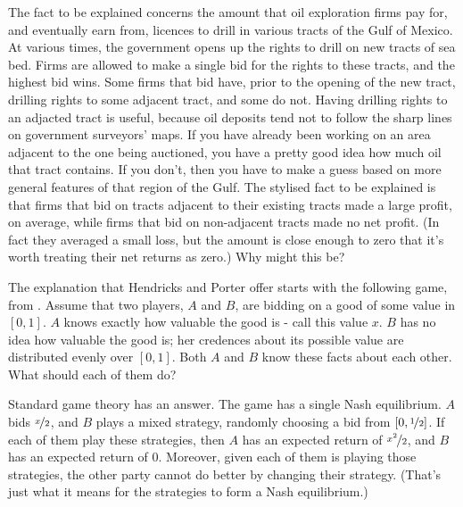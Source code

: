 The fact to be explained concerns the amount that oil exploration firms pay for, and eventually earn from, licences to drill in various tracts of the Gulf of Mexico. At various times, the government opens up the rights to drill on new tracts of sea bed. Firms are allowed to make a single bid for the rights to these tracts, and the highest bid wins. Some firms that bid have, prior to the opening of the new tract, drilling rights to some adjacent tract, and some do not. Having drilling rights to an adjacted tract is useful, because oil deposits tend not to follow the sharp lines on government surveyors' maps. If you have already been working on an area adjacent to the one being auctioned, you have a pretty good idea how much oil that tract contains. If you don't, then you have to make a guess based on more general features of that region of the Gulf. The stylised fact to be explained is that firms that bid on tracts adjacent to their existing tracts made a large profit, on average, while firms that bid on non-adjacent tracts made no net profit. (In fact they averaged a small loss, but the amount is close enough to zero that it's worth treating their net returns as zero.) Why might this be?

The explanation that Hendricks and Porter offer starts with the following game, from \citet{Wilson1967}. Assume that two players, $A$ and $B$, are bidding on a good of some value in $[0, 1]$. $A$ knows exactly how valuable the good is - call this value $x$. $B$ has no idea how valuable the good is; her credences about its possible value are distributed evenly over $[0, 1]$. Both $A$ and $B$ know these facts about each other. What should each of them do?

Standard game theory has an answer. The game has a single Nash equilibrium. $A$ bids $\nicefrac{x}{2}$, and $B$ plays a mixed strategy, randomly choosing a bid from $[0, \nicefrac{1}{2}]$. If each of them play these strategies, then $A$ has an expected return of $\nicefrac{x^2}{2}$, and $B$ has an expected return of 0. Moreover, given each of them is playing those strategies, the other party cannot do better by changing their strategy. (That's just what it means for the strategies to form a Nash equilibrium.) 

